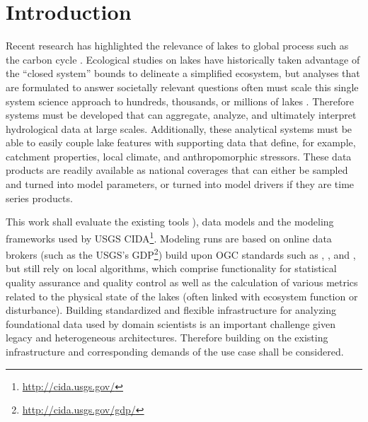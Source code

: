 

\chapter{Introduction}
  Recent research has highlighted the relevance of lakes to global process such as the carbon cycle \citep{cole2007plumbing}.
  Ecological studies on lakes have historically taken advantage of the “closed system” bounds to delineate a simplified ecosystem, but analyses that are formulated to answer societally relevant questions often must scale this single system science approach to hundreds, thousands, or millions of lakes \citep{downing2006global}.
  Therefore systems must be developed that can aggregate, analyze, and ultimately interpret hydrological data at large scales. Additionally, these analytical systems must be able to easily couple lake features with supporting data that define, for example, catchment properties, local climate, and anthropomorphic stressors.
  These data products are readily available as national coverages that can either be sampled and turned into model parameters, or turned into model drivers if they are time series products.

  This work shall evaluate the existing tools \citep[e.g. \la\footnote{\url{https://github.com/GLEON/Lake-Analyzer}}, see][]{read2011derivation}), data models and the modeling frameworks used by USGS CIDA\footnote{\url{http://cida.usgs.gov/}}.
  Modeling runs are based on online data brokers (such as the USGS’s \ac{GDP}\footnote{\url{http://cida.usgs.gov/gdp/}}) build upon \ac{OGC} standards such as , ,  and , but still rely on local algorithms, which comprise functionality for statistical quality assurance and quality control as well as the calculation of various metrics related to the physical state of the lakes (often linked with ecosystem function or disturbance). Building standardized and flexible infrastructure for analyzing foundational data used by domain scientists is an important challenge given legacy and heterogeneous architectures.
  Therefore building on the existing infrastructure and corresponding demands of the use case shall be considered.

